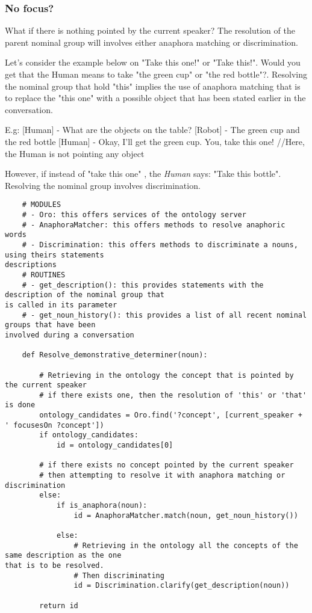 \documentclass[twoside,a4paper,10pt]{report}
\newcommand{\dokutitlelevelfour}[1]{\subsubsection{#1}}
\newcommand{\dokuitalic}[1]{\textsl{#1}}
\begin{document}
\dokutitlelevelfour{No focus?}
What if there is nothing pointed by the current speaker? The resolution of the parent nominal group will involves either anaphora matching or discrimination.

Let's consider the example below on "Take this one!" or "Take this!".
Would you get that the Human means to take "the green cup" or "the red bottle"?. 
Resolving the nominal group that hold "this" implies the use of anaphora matching that is to replace the "this one" with a possible object that has been stated earlier in the conversation.



\small
\begin{verbatimtab}
  E.g: 
  [Human] - What are the objects on the table?
  [Robot] - The green cup and the red bottle
  [Human] - Okay, I'll get the green cup. You, take this one! //Here, the Human is not pointing any
object
\end{verbatimtab}
\normalsize

However, if instead of "take this one" , the \dokuitalic{Human} says: "Take this bottle". Resolving the nominal group involves discrimination. 


\lstset{language=python}
\begin{lstlisting}
    # MODULES
    # - Oro: this offers services of the ontology server
    # - AnaphoraMatcher: this offers methods to resolve anaphoric words
    # - Discrimination: this offers methods to discriminate a nouns, using theirs statements
descriptions
    # ROUTINES
    # - get_description(): this provides statements with the description of the nominal group that
is called in its parameter
    # - get_noun_history(): this provides a list of all recent nominal groups that have been
involved during a conversation 
    
    def Resolve_demonstrative_determiner(noun):
        
        # Retrieving in the ontology the concept that is pointed by the current speaker
        # if there exists one, then the resolution of 'this' or 'that' is done
        ontology_candidates = Oro.find('?concept', [current_speaker + ' focusesOn ?concept'])
        if ontology_candidates:
            id = ontology_candidates[0]
        
        # if there exists no concept pointed by the current speaker
        # then attempting to resolve it with anaphora matching or discrimination
        else:
            if is_anaphora(noun):
                id = AnaphoraMatcher.match(noun, get_noun_history())
                
            else:
                # Retrieving in the ontology all the concepts of the same description as the one
that is to be resolved.
                # Then discriminating
                id = Discrimination.clarify(get_description(noun))
                    
        return id

\end{lstlisting}
\end{document}
